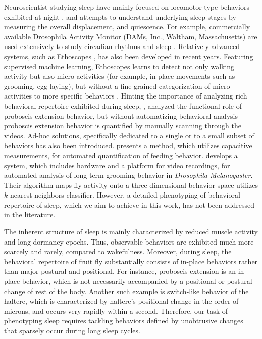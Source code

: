 Neuroscientist studying sleep have mainly focused on locomotor-type behaviors exhibited at night \citep{wiggin_covert_2020, nath_jellyfish_2017}, and attempts to understand underlying sleep-stages by measuring the overall displacement, and quiescence.
For example, commercially available Drosophila Activity Monitor (DAMs, Inc., Waltham, Massachusetts) are used extensively to  study circadian rhythms and sleep \citep{pfeiffenberger_processing_2010, pfeiffenberger_locomotor_2010}.
Relatively advanced systems, such as Ethoscopes \citep{geissmann_ethoscopes_2017}, has also been developed in recent years.
Featuring supervised machine learning, Ethoscopes learns to detect not only walking activity but also micro-activities (for example, in-place movements such as grooming, egg laying), but without a fine-grained categorization of micro-activities to more specific behaviors \citep{geissmann_most_2019}.
Hinting the importance of analyzing rich behavioral repertoire exhibited during sleep, \citet{van_alphen_deep_2021}, analyzed the functional role of proboscis extension behavior, but without automatizing behavioral analysis proboscis extension behavior is quantified by manually scanning through the videos.
Ad-hoc solutions, specifically dedicated to a single or to a small subset of behaviors has also been introduced.
\citet{itskov_automated_2014} presents a method, which utilizes capacitive measurements, for automated quantification of feeding behavior.
\citet{qiao_automated_2018} develops a system, which includes hardware and a platform for video recordings, for automated analysis of long-term grooming behavior in \textit{Drosophila Melanogaster}.
Their algorithm maps fly activity onto a three-dimensional behavior space utilizes $k$-nearest neighbors classifier.
However, a detailed phenotyping of behavioral repertoire of sleep, which we aim to achieve in this work, has not been addressed in the literature.

The inherent structure of sleep is mainly characterized by reduced muscle activity and long dormancy epochs.
Thus, observable behaviors are exhibited much more scarcely and rarely, compared to wakefulness.
Moreover, during sleep, the behavioral repertoire of fruit fly substantially consists of in-place behaviors rather than major postural and positional.
For instance, proboscis extension is an in-place behavior, which is not necessarily accompanied by a positional or postural change of rest of the body.
Another such example is switch-like behavior of the haltere, which is characterized by haltere's positional change in the order of microns, and occurs very rapidly within a second.
Therefore, our task of phenotyping sleep requires tackling behaviors defined by unobtrusive changes that sparsely occur during long sleep cycles.

